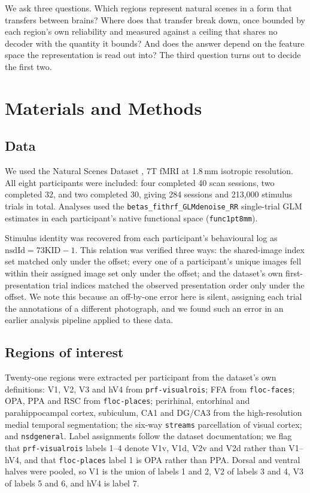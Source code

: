 \documentclass[11pt,a4paper]{article}
\begin{document}
We ask three questions. Which regions represent natural scenes in a form that
transfers between brains? Where does that transfer break down, once bounded by
each region's own reliability and measured against a ceiling that shares no
decoder with the quantity it bounds? And does the answer depend on the feature
space the representation is read out into? The third question turns out to decide
the first two.

\section{Materials and Methods}

\subsection{Data}

We used the Natural Scenes Dataset \citep{allen2022}, 7T fMRI at 1.8\,mm
isotropic resolution. All eight participants were included: four completed 40
scan sessions, two completed 32, and two completed 30, giving 284 sessions and
213{,}000 stimulus trials in total. Analyses used the
\texttt{betas\_fithrf\_GLMdenoise\_RR} single-trial GLM estimates in each
participant's native functional space (\texttt{func1pt8mm}).

Stimulus identity was recovered from each participant's behavioural log as
$\mathrm{nsdId} = \mathrm{73KID} - 1$. This relation was verified three ways: the
shared-image index set matched only under the offset; every one of a
participant's unique images fell within their assigned image set only under the
offset; and the dataset's own first-presentation trial indices matched the
observed presentation order only under the offset. We note this because an
off-by-one error here is silent, assigning each trial the annotations of a
different photograph, and we found such an error in an earlier analysis
pipeline applied to these data.

\subsection{Regions of interest}

Twenty-one regions were extracted per participant from the dataset's own
definitions: V1, V2, V3 and hV4 from \texttt{prf-visualrois}; FFA from
\texttt{floc-faces}; OPA, PPA and RSC from \texttt{floc-places}; perirhinal,
entorhinal and parahippocampal cortex, subiculum, CA1 and DG/CA3 from the
high-resolution medial temporal segmentation; the six-way \texttt{streams}
parcellation of visual cortex; and \texttt{nsdgeneral}. Label assignments follow
the dataset documentation; we flag that \texttt{prf-visualrois} labels 1--4
denote V1v, V1d, V2v and V2d rather than V1--hV4, and that \texttt{floc-places}
label 1 is OPA rather than PPA. Dorsal and ventral halves were pooled, so V1 is
the union of labels 1 and 2, V2 of labels 3 and 4, V3 of labels 5 and 6, and hV4
is label 7.
\end{document}
